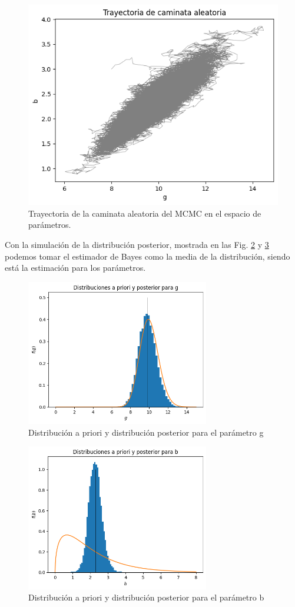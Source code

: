 \documentclass{article}
\begin{document}
\begin{figure}
    \centering 
    \includegraphics[width = 8 cm]{Figures/trayectoria.png} 
    \caption{Trayectoria de la caminata aleatoria del MCMC en el espacio de parámetros.}
    \label{Fig. 02}
\end{figure} 

Con la simulación de la distribución posterior, mostrada en las Fig. \ref{Fig. 3.03} y \ref{Fig. 3.04} podemos tomar el estimador de Bayes como la media de la distribución, siendo está la estimación para los parámetros.

\begin{figure}
    \centering 
    \includegraphics[width = 8cm ]{Figures/g.png}    
    \caption{Distribución a priori y distribución posterior para el parámetro g}
    \label{Fig. 3.03}
\end{figure} 


\begin{figure}
    \centering 
    \includegraphics[width = 8cm ]{Figures/b.png}    
    \caption{Distribución a priori y distribución posterior para el parámetro b}
    \label{Fig. 3.04}
\end{figure} 
\end{document}
